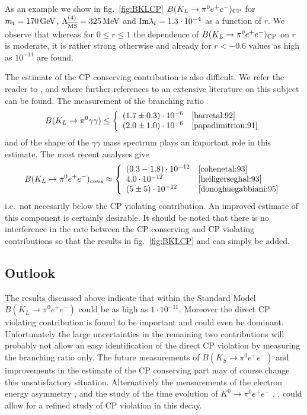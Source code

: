 As an example we show in fig.\ \ref{fig:BKLCP} $B(K_L \to \pi^0
e^+e^-)_{\rm CP}$ for $m_{\rm t}=170\, {\rm GeV}$, $\Lambda_{\overline{\rm MS}}^{(4)}=325\, {\rm MeV}$ and
${\rm Im}\lambda_t = 1.3 \cdot 10^{-4}$ as a function of $r$.
We observe that whereas for $0 \le r \le 1$ the dependence of $B(K_L \to
\pi^0 e^+e^-)_{\rm CP}$ on $r$ is moderate, it is rather strong
otherwise and already for $r < -0.6$ values as high as $10^{-11}$ are
found.

The estimate of the CP conserving contribution is also difficult. We
refer the reader to \cite{cohenetal:93}, \cite{heiligerseghal:93} and
\cite{donoghuegabbiani:95} where further references to an extensive
literature on this subject can be found. The measurement of the
branching ratio
\begin{equation}
B(K_L \to \pi^0 \gamma\gamma) \leq
\left\{ \begin{array}{ll}
(1.7\pm 0.3) \cdot 10^{-6} & \hbox{\cite{barretal:92}} \\
(2.0\pm 1.0) \cdot 10^{-6} & \hbox{\cite{papadimitriou:91}}
\end{array} \right.
\label{eq:BKLexp}
\end{equation}
and of the shape of the $\gamma\gamma$ mass spectrum plays an important
role in this estimate. The most recent analyses give
\begin{equation}
B(K_L \to \pi^0 e^+ e^-)_{cons}\approx\left\{ \begin{array}{ll}
(0.3-1.8)\cdot 10^{-12} & \hbox{\cite{cohenetal:93}} \\
     4.0 \cdot 10^{-12} & \hbox{\cite{heiligerseghal:93}} \\
(5 \pm 5)\cdot 10^{-12} & \hbox{\cite{donoghuegabbiani:95}}
\end{array} \right.
\label{eq:BKLtheo}
\end{equation}
i.e.\ not necesarily below the CP violating contribution.
An improved estimate of this component is certainly desirable.
It should be noted that there is no interference in the rate between
the CP conserving and CP violating contributions so that the results
in fig.\ \ref{fig:BKLCP} and  can simply be added.

\subsection{Outlook} 
            \label{sec:KLpee:Outlook}
The results discussed above indicate that within the Standard Model
$B(K_L \to \pi^0 e^+ e^-)$ could be as high as $1\cdot 10^{-11}$.
Moreover the direct CP violating contribution is found to be important
and could even be dominant. Unfortunately the large uncertainties in
the remaining two contributions will probably not allow an easy
identification of the direct CP violation by measuring the branching
ratio only. The future measurements of $B(K_S \to \pi^0 e^+e^-)$ and
improvements in the estimate of the CP conserving part may of course
change this unsatisfactory situation. Alternatively the measurements
of the electron energy asymmetry \cite{heiligerseghal:93}, 
\cite{donoghuegabbiani:95} and the study of the time evolution of $K^0 \to
\pi^0 e^+e^-$ \cite{littenberg:89b}, \cite{donoghuegabbiani:95},
\cite{kohlerpaschos:95} could allow for a refined study of CP violation
in this decay.

